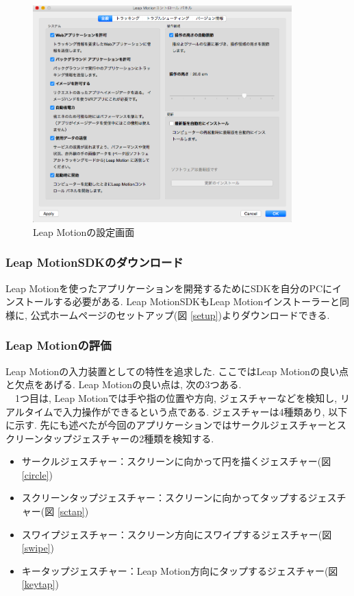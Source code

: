 \documentclass{funthesis}
\begin{document}
\begin{figure}[H]
 \begin{center}
  \includegraphics[width=100mm]{./img/Lset.png}
 \end{center}
 \caption{Leap Motionの設定画面}
 \label{Lset}
\end{figure}

\subsubsection{Leap MotionSDKのダウンロード}
Leap Motionを使ったアプリケーションを開発するためにSDKを自分のPCにインストールする必要がある. Leap MotionSDKもLeap Motionインストーラーと同様に, 公式ホームページのセットアップ(図 \ref{setup})よりダウンロードできる. 


\subsubsection{Leap Motionの評価}
Leap Motionの入力装置としての特性を追求した. ここではLeap Motionの良い点と欠点をあげる. Leap Motionの良い点は, 次の3つある. \\ 
　1つ目は, Leap Motionでは手や指の位置や方向, ジェスチャーなどを検知し, リアルタイムで入力操作ができるという点である. ジェスチャーは4種類あり, 以下に示す. 先にも述べたが今回のアプリケーションではサークルジェスチャーとスクリーンタップジェスチャーの2種類を検知する. \\
\begin{itemize}
 \item サークルジェスチャー：スクリーンに向かって円を描くジェスチャー(図 \ref{circle})
 \item スクリーンタップジェスチャー：スクリーンに向かってタップするジェスチャー(図 \ref{sctap})
 \item スワイプジェスチャー：スクリーン方向にスワイプするジェスチャー(図 \ref{swipe})
 \item キータップジェスチャー：Leap Motion方向にタップするジェスチャー(図 \ref{keytap})
\end{itemize}
\end{document}
